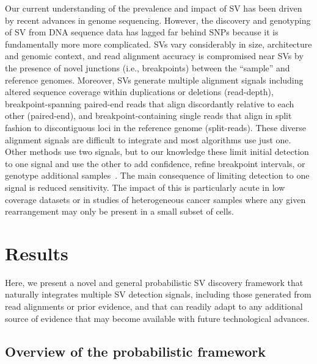 \documentclass[10pt]{bmc_article}
\newenvironment{bmcformat}{\begin{raggedright}\baselineskip20pt\sloppy\setboolean{publ}{false}}{\end{raggedright}\baselineskip20pt\sloppy}
\begin{document}
\begin{bmcformat}
Our current understanding of the prevalence and impact of SV has
been driven by recent advances in genome sequencing. However, the discovery and
genotyping of SV from DNA sequence data has lagged far behind SNPs because it is
fundamentally more more complicated. SVs vary considerably in size, architecture
and genomic context, and read alignment accuracy is compromised near SVs by the
presence of novel junctions (i.e., breakpoints) between the ``sample'' and
reference genomes. Moreover, SVs generate multiple alignment signals including
altered sequence coverage within duplications or deletions (read-depth),
breakpoint-spanning paired-end reads that align discordantly relative to each
other (paired-end), and breakpoint-containing single reads that align in split
fashion to discontiguous loci in the reference genome (split-reads). These
diverse alignment signals are difficult to integrate and most algorithms use
just one. Other methods use two signals, but to our knowledge these limit
initial detection to one signal and use the other to add confidence, refine
breakpoint intervals, or genotype additional
samples~\cite{rausch2012b,sindi2012,handsaker2011}. The main consequence of
limiting detection to one signal is reduced sensitivity.  The impact of this is
particularly acute in low coverage datasets or in studies of heterogeneous
cancer samples where any given rearrangement may only be present in a small
subset of cells.




\section*{Results}
Here, we present a novel and general probabilistic SV discovery framework that
naturally integrates multiple SV detection signals, including those generated
from read alignments or prior evidence, and that can readily adapt to any
additional source of evidence that may become available with future
technological advances.

\subsection*{Overview of the probabilistic framework}


\end{bmcformat}
\end{document}
